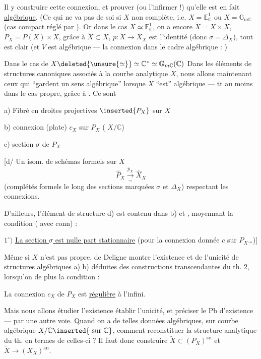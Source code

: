 Il y  construire cette connexion, et prouver (ou l'infirmer !) qu'elle est en fait \uline{algébrique}. (Ce qui ne va pas de soi si $X$ non complète, i.e. $X=\mathbb E^1_{\mathbb C}$ ou $X=\mathbb G_{m\mathbb C}$ (cas compact réglé par ). Or dans le cas $X\simeq \mathbb E^1_{\mathbb C}$, on a encore $\widetilde X=X\times X$, $P_X=P(X)\times X$, grâce à $\widetilde X\subset X$, $p:\widetilde X\longrightarrow X_X$ est l'identité (donc $\sigma=\Delta_X$), tout est clair (et $V$ est algébrique --- la connexion dans le cadre algébrique : )

Dans le cas de $X\deleted{\unsure{\simeq}}\simeq\mathbb C^*\simeq\mathbb G_{m\mathbb C}(\mathbb C)$
Dans les éléments de structures canoniques associés à la courbe analytique $X$, nous allons  maintenant ceux qui ``gardent un sens algébrique'' lorsque $X$ ``est'' algébrique --- tt au moins dans le cas propre, grâce à .
Ce sont

a) Fibré en droites projectives $\inserted{P_X}$ sur $X$

b) connexion (plate) $c_X$ sur $P_X$ ( $X/\mathbb C$)

c) section $\sigma$ de $P_X$

[d/ Un isom. de schémas formels sur $X$
\[\widehat P_X\xrightarrow[\sim]{\widehat p_X}\widehat X_X\]
(complétés formels le long des sections marquées $\sigma$ et $\Delta_X$) respectant les connexions.

D'ailleurs, l'élément de structure d) est contenu dans b) et , moyennant la condition (  avec conn) :

$1^\circ)$ \uline{La section $\sigma$ est nulle part stationnaire} (pour la connexion donnée $c$ sur $P_X$\ldots)]

Même si $X$ n'est pas propre,  de Deligne montre l'existence et de l'unicité de structures algébriques a) b)  déduites des constructions transcendantes du th. 2, lorsqu'on  de plus la condition :

 La connexion $c_X$ de $P_X$ est \uline{régulière} à l'infini.

Mais nous allons étudier l'existence  établir l'unicité, et préciser le Pb d'existence --- par une autre voie.
Quand on a de telles données algébriques, sur courbe algébrique $X/\mathbb C\inserted{\text{ sur }\mathbb C}$, comment reconstituer la structure analytique du th. en termes de celles-ci ? Il faut donc construire  $\widetilde X\subset(P_X)^{\mathrm{an}}$ et $\widetilde X\longrightarrow(X_X)^{\mathrm{an}}$.

